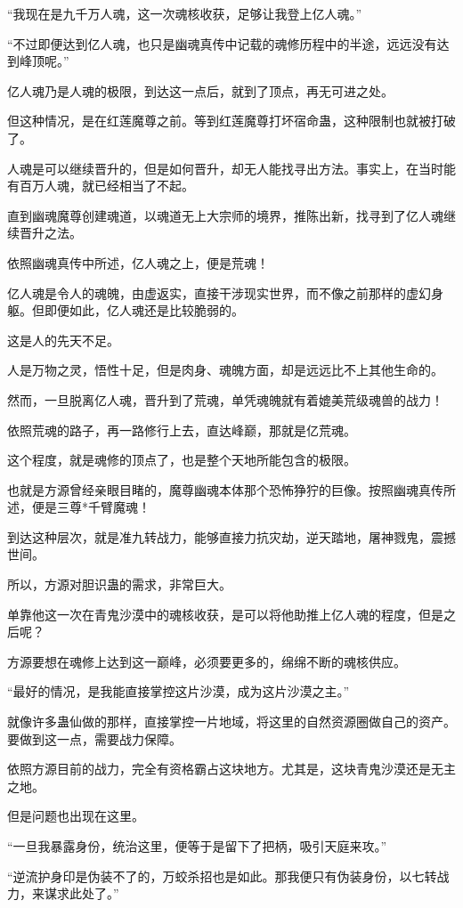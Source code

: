 \begin{this_body}
“我现在是九千万人魂，这一次魂核收获，足够让我登上亿人魂。”

“不过即便达到亿人魂，也只是幽魂真传中记载的魂修历程中的半途，远远没有达到峰顶呢。”

亿人魂乃是人魂的极限，到达这一点后，就到了顶点，再无可进之处。

但这种情况，是在红莲魔尊之前。等到红莲魔尊打坏宿命蛊，这种限制也就被打破了。

人魂是可以继续晋升的，但是如何晋升，却无人能找寻出方法。事实上，在当时能有百万人魂，就已经相当了不起。

直到幽魂魔尊创建魂道，以魂道无上大宗师的境界，推陈出新，找寻到了亿人魂继续晋升之法。

依照幽魂真传中所述，亿人魂之上，便是荒魂！

亿人魂是令人的魂魄，由虚返实，直接干涉现实世界，而不像之前那样的虚幻身躯。但即便如此，亿人魂还是比较脆弱的。

这是人的先天不足。

人是万物之灵，悟性十足，但是肉身、魂魄方面，却是远远比不上其他生命的。

然而，一旦脱离亿人魂，晋升到了荒魂，单凭魂魄就有着媲美荒级魂兽的战力！

依照荒魂的路子，再一路修行上去，直达峰巅，那就是亿荒魂。

这个程度，就是魂修的顶点了，也是整个天地所能包含的极限。

也就是方源曾经亲眼目睹的，魔尊幽魂本体那个恐怖狰狞的巨像。按照幽魂真传所述，便是三尊*千臂魔魂！

到达这种层次，就是准九转战力，能够直接力抗灾劫，逆天踏地，屠神戮鬼，震撼世间。

所以，方源对胆识蛊的需求，非常巨大。

单靠他这一次在青鬼沙漠中的魂核收获，是可以将他助推上亿人魂的程度，但是之后呢？

方源要想在魂修上达到这一巅峰，必须要更多的，绵绵不断的魂核供应。

“最好的情况，是我能直接掌控这片沙漠，成为这片沙漠之主。”

就像许多蛊仙做的那样，直接掌控一片地域，将这里的自然资源圈做自己的资产。要做到这一点，需要战力保障。

依照方源目前的战力，完全有资格霸占这块地方。尤其是，这块青鬼沙漠还是无主之地。

但是问题也出现在这里。

“一旦我暴露身份，统治这里，便等于是留下了把柄，吸引天庭来攻。”

“逆流护身印是伪装不了的，万蛟杀招也是如此。那我便只有伪装身份，以七转战力，来谋求此处了。”


\end{this_body}
